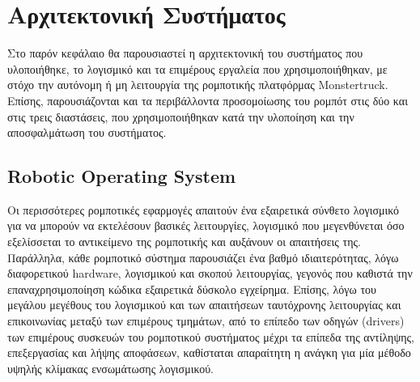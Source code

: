 
\chapter{Αρχιτεκτονική Συστήματος} %

\label{Chapter4}
Στο παρόν κεφάλαιο θα παρουσιαστεί η αρχιτεκτονική του συστήματος που υλοποιήθηκε, το λογισμικό και τα επιμέρους εργαλεία που χρησιμοποιήθηκαν, με στόχο την αυτόνομη ή μη λειτουργία της ρομποτικής πλατφόρμας Monstertruck. Επίσης, παρουσιάζονται και τα περιβάλλοντα προσομοίωσης του ρομπότ στις δύο και στις τρεις διαστάσεις, που χρησιμοποιήθηκαν κατά την υλοποίηση και την αποσφαλμάτωση του συστήματος.

\section{Robotic Operating System} \label{sec:ros}
Οι περισσότερες ρομποτικές εφαρμογές απαιτούν ένα εξαιρετικά σύνθετο λογισμικό για να μπορούν να εκτελέσουν βασικές λειτουργίες, λογισμικό που μεγενθύνεται όσο εξελίσσεται το αντικείμενο της ρομποτικής και αυξάνουν οι απαιτήσεις της. Παράλληλα, κάθε ρομποτικό σύστημα παρουσιάζει ένα βαθμό ιδιαιτερότητας, λόγω διαφορετικού hardware, λογισμικού και σκοπού λειτουργίας, γεγονός που καθιστά την επαναχρησιμοποίηση κώδικα εξαιρετικά δύσκολο εγχείρημα. Επίσης, λόγω του μεγάλου μεγέθους του λογισμικού και των απαιτήσεων ταυτόχρονης λειτουργίας και επικοινωνίας μεταξύ των επιμέρους τμημάτων, από το επίπεδο των οδηγών (drivers) των επιμέρους συσκευών του ρομποτικού συστήματος μέχρι τα επίπεδα της αντίληψης, επεξεργασίας και λήψης αποφάσεων, καθίσταται απαραίτητη η ανάγκη για μία μέθοδο υψηλής κλίμακας ενσωμάτωσης λογισμικού.

